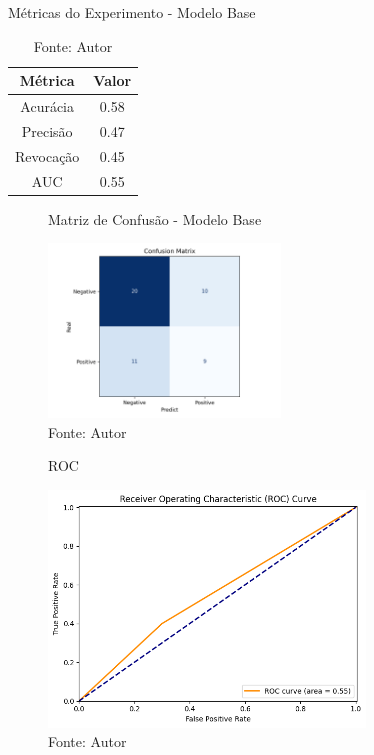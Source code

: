 \begin{table}[h!]
    \centering
    \caption{Métricas do Experimento - Modelo Base}
    \renewcommand{\arraystretch}{1} %
    \begin{tabular}{|c|c|}
    \hline 
          \textbf{Métrica} & \textbf{Valor} \\ 
    \hline 
        Acurácia & 0.58 \\ 
    \hline 
        Precisão & 0.47 \\ 
    \hline 
        Revocação & 0.45 \\ 
    \hline 
        AUC & 0.55 \\ 
    \hline 
    \end{tabular} 
    \caption*{Fonte: Autor}
    \label{tab:metrics}
\end{table}

\begin{figure}[h!]
    \centering
    \caption{Matriz de Confusão -  Modelo Base}
    \includegraphics[width=0.55\textwidth]{figures/fig016.png}
    \caption*{Fonte: Autor}
    \label{fig:fig016}
\end{figure}

\begin{figure}[h!]
    \centering
    \caption{ROC}
    \includegraphics[width=0.75\textwidth]{figures/fig017.png}
    \caption*{Fonte: Autor}
    \label{fig:fig017}
\end{figure}



